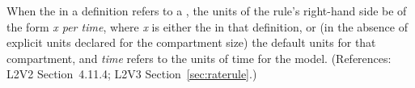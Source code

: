 When the  in a \RateRule definition refers to a
\Compartment, the units of the rule's right-hand side  be of the form
\emph{x per time}, where \emph{x} is either the  in that
\Compartment definition, or (in the absence of explicit units declared for
the compartment size) the default units for that compartment, and
\emph{time} refers to the units of time for the model.  (References: L2V2
Section~4.11.4; L2V3 Section~\ref{sec:raterule}.)
